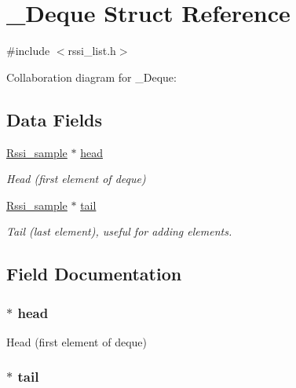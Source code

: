 \hypertarget{struct___deque}{}\section{\+\_\+\+Deque Struct Reference}
\label{struct___deque}


{\ttfamily \#include $<$rssi\+\_\+list.\+h$>$}



Collaboration diagram for \+\_\+\+Deque\+:
\subsection*{Data Fields}
\begin{DoxyCompactItemize}
\item 
\hyperlink{struct_rssi__sample}{Rssi\+\_\+sample} $\ast$ \hyperlink{struct___deque_aa1dd70b68bfe0b88a8d75860e4f29065}{head}
\begin{DoxyCompactList}\small\item\em Head (first element of deque) \end{DoxyCompactList}\item 
\hyperlink{struct_rssi__sample}{Rssi\+\_\+sample} $\ast$ \hyperlink{struct___deque_ae32d5a04daa361aafb9f9397d771ca24}{tail}
\begin{DoxyCompactList}\small\item\em Tail (last element), useful for adding elements. \end{DoxyCompactList}\end{DoxyCompactItemize}


\subsection{Field Documentation}
\hypertarget{struct___deque_aa1dd70b68bfe0b88a8d75860e4f29065}{}
\subsubsection[{head}]{$\ast$ head}\label{struct___deque_aa1dd70b68bfe0b88a8d75860e4f29065}


Head (first element of deque) 

\hypertarget{struct___deque_ae32d5a04daa361aafb9f9397d771ca24}{}
\subsubsection[{tail}]{$\ast$ tail}\label{struct___deque_ae32d5a04daa361aafb9f9397d771ca24}



